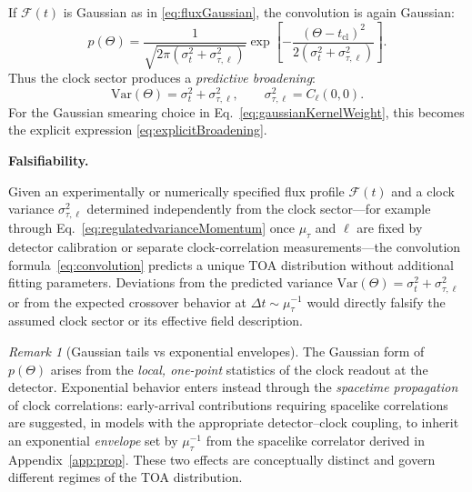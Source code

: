 \documentclass[11pt, a4paper]{article}
\theoremstyle{definition}
\theoremstyle{plain}
\theoremstyle{remark}
\newtheorem{remark}{Remark}[section]
\numberwithin{equation}{section}
\newcommand{\F}{\mathcal{F}}
\begin{document}
        If $\F(t)$ is Gaussian as in \eqref{eq:fluxGaussian}, the convolution is again Gaussian:
        \begin{equation}
            p(\Theta)=\frac{1}{\sqrt{2\pi(\sigma_t^2+\sigma_{\tau,\ell}^2)}}
            \exp\!\left[-\frac{(\Theta-t_{\mathrm{cl}})^2}{2(\sigma_t^2+\sigma_{\tau,\ell}^2)}\right].
            \label{eq:pGaussian}
        \end{equation}
        Thus the clock sector produces a \emph{predictive broadening}:
        \begin{equation}
            \mathrm{Var}(\Theta)=\sigma_t^2+\sigma_{\tau,\ell}^2,
            \qquad
            \sigma_{\tau,\ell}^2=C_\ell(0,0).
            \label{eq:varianceAddition}
        \end{equation}
        For the Gaussian smearing choice in Eq.~\eqref{eq:gaussianKernelWeight}, this becomes the explicit expression \eqref{eq:explicitBroadening}.

        \medskip\noindent\textbf{Falsifiability.}\par
            Given an experimentally or numerically specified flux profile $\mathcal{F}(t)$ and a clock variance $\sigma_{\tau,\ell}^2$ determined independently from the clock sector---for example through Eq.~\eqref{eq:regulatedvarianceMomentum} once $\mu_\tau$ and $\ell$ are fixed by detector calibration or separate clock-correlation measurements---the convolution formula~\eqref{eq:convolution} predicts a unique TOA distribution without additional fitting parameters. Deviations from the predicted variance $\mathrm{Var}(\Theta)=\sigma_t^2+\sigma_{\tau,\ell}^2$ or from the expected crossover behavior at $\Delta t\sim\mu_\tau^{-1}$ would directly falsify the assumed clock sector or its effective field description.

            \begin{remark}[Gaussian tails vs exponential envelopes]
The Gaussian form of $p(\Theta)$ arises from the \emph{local, one-point} statistics of the clock readout at the detector. Exponential behavior enters instead through the \emph{spacetime propagation} of clock correlations: early-arrival contributions requiring spacelike correlations are suggested, in models with the appropriate detector--clock coupling, to inherit an exponential \emph{envelope} set by $\mu_\tau^{-1}$ from the spacelike correlator derived in Appendix~\ref{app:prop}. These two effects are conceptually distinct and govern different regimes of the TOA distribution.
            \end{remark}
\end{document}
